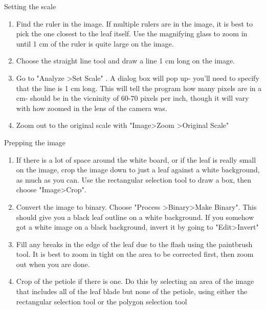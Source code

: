 \documentclass[11pt]{article}
\begin{document}
Setting the scale
\begin{enumerate}
\item{Find the ruler in the image. If multiple rulers are in the image, it is best to pick
the one closest to the leaf itself. Use the magnifying glass to zoom in until 1 cm
of the ruler is quite large on the image.}
\item{Choose the straight line tool and draw a line 1 cm long on the image.}
\item{Go to "Analyze \textgreater Set Scale" . A dialog box will pop up- you'll need to specify that the line is 1 cm long. This will tell the program how many pixels are in a cm- should be in the vicninity of 60-70 pixels per inch, though it will vary with how zoomed in the lens of the camera was.}
\item{Zoom out to the original scale with "Image\textgreater Zoom \textgreater Original Scale"}
\end{enumerate}

Prepping the image
\begin{enumerate}
\item{If there is a lot of space around the white board, or if the leaf is really small on the
image, crop the image down to just a leaf against a white background, as much as you can. Use the rectangular selection tool to draw a box, then choose "Image\textgreater Crop".}
\item{Convert the image to binary. Choose "Process \textgreater Binary\textgreater Make Binary". This should give you a black leaf outline on a white background. If you somehow got a white image on a black background, invert it by going to "Edit\textgreater Invert"}
\item{Fill any breaks in the edge of the leaf due to the flash using the paintbrush tool. It is best to zoom in tight on the area to be corrected first, then zoom out when you are done.}
\item{Crop of the petiole if there is one. Do this by selecting an area of the image that includes all of the leaf blade but none of the petiole, using either the rectangular selection tool or the polygon selection tool}
\end{enumerate}
\end{document}
